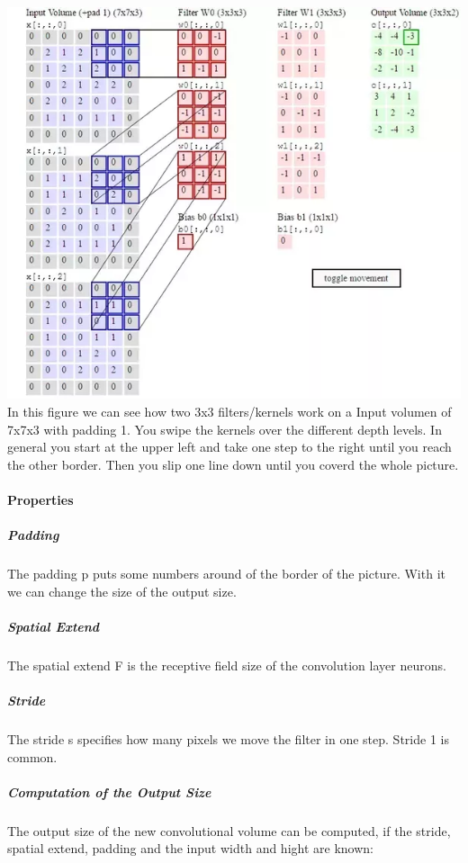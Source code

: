 \documentclass[11pt]{article}
\makeatletter
\def\maxwidth{\ifdim\Gin@nat@width>\linewidth\linewidth
    \else\Gin@nat@width\fi}
\let\Oldincludegraphics\includegraphics
\renewcommand{\includegraphics}[1]{\Oldincludegraphics[width=.8\maxwidth]{#1}}
\makeatother
\begin{document}
\includegraphics{conv_filter.png} In this figure we can see how two 3x3
filters/kernels work on a Input volumen of 7x7x3 with padding 1. You
swipe the kernels over the different depth levels. In general you start
at the upper left and take one step to the right until you reach the
other border. Then you slip one line down until you coverd the whole
picture.

\paragraph{Properties}\label{properties}

\subparagraph{Padding}\label{padding}

The padding p puts some numbers around of the border of the picture.
With it we can change the size of the output size.

\subparagraph{Spatial Extend}\label{spatial-extend}

The spatial extend F is the receptive field size of the convolution
layer neurons.

\subparagraph{Stride}\label{stride}

The stride s specifies how many pixels we move the filter in one step.
Stride 1 is common.

\subparagraph{Computation of the Output
Size}\label{computation-of-the-output-size}

The output size of the new convolutional volume can be computed, if the
stride, spatial extend, padding and the input width and hight are known:
\end{document}
